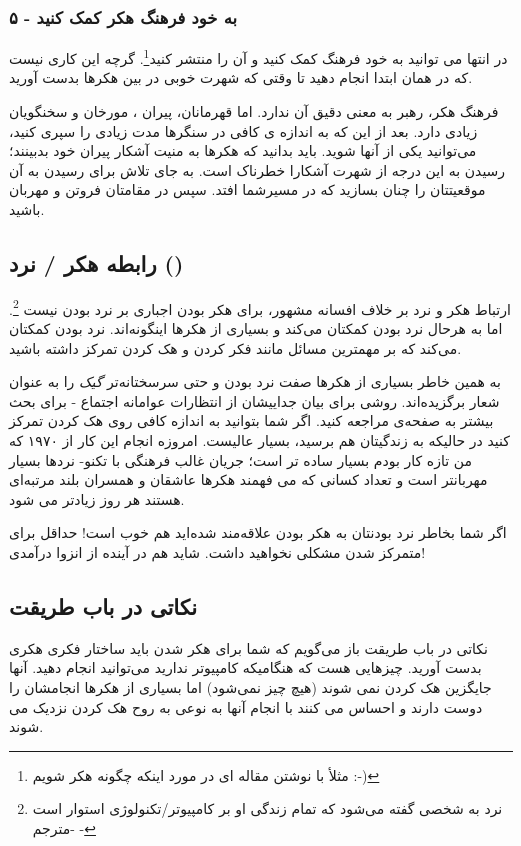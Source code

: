 \subsubsection*{۵ - به خود فرهنگ هکر کمک کنید}
در انتها می توانید به خود فرهنگ کمک کنید و آن را منتشر کنید\footnote{مثلأ با نوشتن مقاله ای در مورد اینکه چگونه هکر شویم :-)}.
گرچه این کاری نیست که در همان ابتدا انجام دهید تا وقتی که شهرت خوبی در بین هکرها بدست آورید.

فرهنگ هکر، رهبر به معنی دقیق آن ندارد. اما قهرمانان، پیران ، مورخان و سخنگویان زیادی دارد. بعد از این که به اندازه ی کافی در سنگرها مدت زیادی را سپری کنید، می‌توانید یکی از آنها شوید. باید بدانید که هکرها به منیت آشکار پیران خود بدبینند؛ رسیدن به این درجه از شهرت آشکارا خطرناک است. به جای تلاش برای رسیدن به آن موقعیتتان را چنان بسازید که در مسیرشما افتد. سپس در مقامتان فروتن و مهربان باشید.
\subsection*{رابطه هکر / نرد ()}
ارتباط هکر و نرد بر خلاف افسانه مشهور، برای هکر بودن اجباری بر نرد بودن نیست 
\footnote{نرد به شخصی گفته می‌شود که تمام زندگی او بر کامپیوتر/تکنولوژی استوار است -مترجم -}.
 اما به هرحال نرد بودن کمکتان می‌کند و بسیاری از هکرها اینگونه‌اند. نرد بودن کمکتان می‌کند که بر مهمترین مسائل مانند فکر کردن و هک کردن تمرکز داشته باشید.

به همین خاطر بسیاری از هکرها صفت نرد بودن و حتی سرسختانه‌تر
\emph{گیک}
را به عنوان شعار برگزیده‌اند. روشی برای بیان جداییشان از انتظارات عوامانه اجتماع - برای بحث بیشتر به صفحه‌ی
مراجعه کنید.
اگر شما بتوانید به اندازه کافی روی هک کردن تمرکز کنید در حالیکه به زندگیتان هم برسید، بسیار عالیست. امروزه انجام این کار از ۱۹۷۰ که من تازه کار بودم بسیار ساده تر است؛ جریان غالب فرهنگی با تکنو- نردها بسیار مهربانتر است و تعداد کسانی که می فهمند هکرها عاشقان و همسران بلند مرتبه‌ای هستند هر روز زیادتر می شود.

اگر شما بخاطر نرد بودنتان به هکر بودن علاقه‌مند شده‌اید هم خوب است! حداقل برای متمرکز شدن مشکلی نخواهید داشت. شاید هم در آینده از انزوا درآمدی!
\subsection*{نکاتی در باب طریقت}
نکاتی در باب طریقت باز می‌گویم که شما برای هکر شدن باید ساختار فکری هکری بدست آورید. چیزهایی هست که هنگامیکه کامپیوتر ندارید می‌توانید انجام دهید. آنها جایگزین هک کردن نمی شوند (هیچ چیز نمی‌شود) اما بسیاری از هکرها انجامشان را دوست دارند و احساس می کنند با انجام آنها به نوعی به روح هک کردن نزدیک می شوند.

